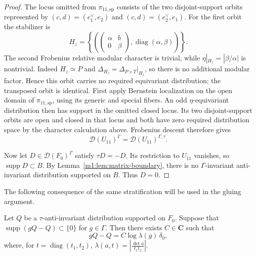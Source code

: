 \begin{proof}
The locus omitted from $\pi_{11,\mathrm{sp}}$ consists of the two
disjoint-support orbits represented by \((c,d)=(e_1^\vee,e_2)\) and \((c,d)=(e_2^\vee,e_1)\).
For the first orbit the stabilizer is
\[
    H_z=
    \left\{
    \left(
        \begin{pmatrix}\alpha&b\\0&\beta\end{pmatrix},
        \operatorname{diag}(\alpha,\beta)
    \right)
    \right\}.
\]
The second Frobenius relative modular character is trivial, while
$\eta|_{H_z}=|\beta/\alpha|$ is nontrivial. Indeed $H_z\simeq P$ and
$\Delta_{H_z}=\Delta_{P\times T}|_{H_z}$, so there is no additional modular
factor. Hence this orbit carries no
required equivariant distribution; the transposed orbit is identical.
First apply Bernstein localization on the open domain of
$\pi_{11,\mathrm{sp}}$, using its generic and special fibers.
An odd $\eta$-equivariant distribution then has support in the omitted
closed locus. Its two disjoint-support orbits are open and closed in
that locus and both have zero required distribution space by the
character calculation above. Frobenius descent therefore gives
\[
    \mathcal D(U_{11})^\Gamma=\mathcal D(U_{11})^{\Gamma,\tau}.
\]

Now let $D\in\mathcal D(F_0)^\Gamma$ satisfy $\tau D=-D$.  Its restriction to
$U_{11}$ vanishes, so $\operatorname{supp}D\subset B$.  By
Lemma~\ref{m1:lem:matrix-boundary}, there is no $\Gamma$-invariant anti-invariant
distribution supported on $B$.  Thus $D=0$.
\end{proof}

The following consequence of the same stratification will be used in the
gluing argument.

\begin{corollary}\label{m1:cor:boundary-anomaly}
Let $Q$ be a $\tau$-anti-invariant distribution supported on $F_0$.  Suppose
that \(\operatorname{supp}(gQ-Q)\subset\{0\}\) for \(g\in \Gamma\). Then there exists $C\in\mathbf C$ such that
\begin{equation}\label{m1:eq:boundary-anomaly}
    gQ-Q=C\log\lambda(g)\,\delta_0,
\end{equation}
where, for $t=\operatorname{diag}(t_1,t_2)$, \(\lambda(a,t) =\left|\frac{\det a}{t_1t_2}\right|\). \end{corollary}

